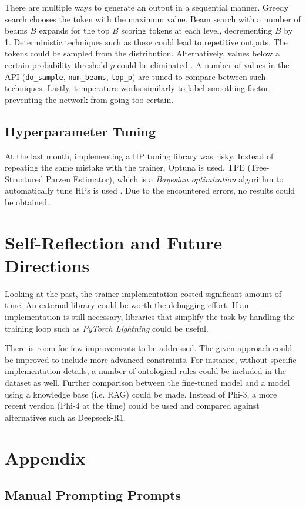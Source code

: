 \documentclass{article}
\begin{document}
There are multiple ways to generate an output in a sequential manner. Greedy search chooses the token with the maximum value. Beam search with a number of beams $B$ expands for the top $B$ scoring tokens at each level, decrementing $B$ by 1. Deterministic techniques such as these could lead to repetitive outputs. The tokens could be sampled from the distribution. Alternatively, values below a certain probability threshold $p$ could be eliminated \cite{holtzman_curious_2020}. A number of values in the API (\texttt{do\_sample}, \texttt{num\_beams}, \texttt{top\_p}) are tuned to compare between such techniques. Lastly, temperature works similarly to label smoothing factor, preventing the network from going too certain.
\subsection{Hyperparameter Tuning}
At the last month, implementing a HP tuning library was risky. Instead of repeating the same mistake with the trainer, Optuna is used. TPE (Tree-Structured Parzen Estimator), which is a \textit{Bayesian optimization} algorithm to automatically tune HPs is used \cite{watanabe_tree-structured_2023}. Due to the encountered errors, no results could be obtained.
\section{Self-Reflection and Future Directions}

Looking at the past, the trainer implementation costed significant amount of time. An external library could be worth the debugging effort. If an implementation is still necessary, libraries that simplify the task by handling the training loop such as \textit{PyTorch Lightning} could be useful.

There is room for few improvements to be addressed. The given approach could be improved to include more advanced constraints. For instance, without specific implementation details, a number of ontological rules could be included in the dataset as well. Further comparison between the fine-tuned model and a model using a knowledge base (i.e. RAG) could be made. Instead of Phi-3, a more recent version (Phi-4 at the time) could be used and compared against alternatives such as Deepseek-R1. 

\section{Appendix}
\subsection{Manual Prompting Prompts \label{man_prompts}}
\end{document}
